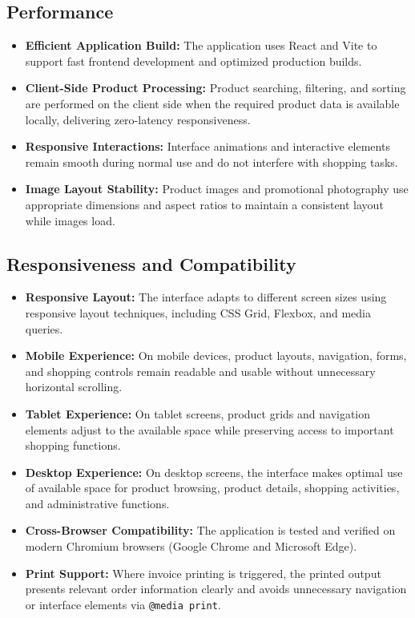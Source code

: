 \documentclass[12pt,a4paper,oneside]{report}
\begin{document}
\subsection{Performance}
\begin{itemize}[leftmargin=1.2cm]
    \item \textbf{Efficient Application Build:} The application uses React and Vite to support fast frontend development and optimized production builds.
    \item \textbf{Client-Side Product Processing:} Product searching, filtering, and sorting are performed on the client side when the required product data is available locally, delivering zero-latency responsiveness.
    \item \textbf{Responsive Interactions:} Interface animations and interactive elements remain smooth during normal use and do not interfere with shopping tasks.
    \item \textbf{Image Layout Stability:} Product images and promotional photography use appropriate dimensions and aspect ratios to maintain a consistent layout while images load.
\end{itemize}

\subsection{Responsiveness and Compatibility}
\begin{itemize}[leftmargin=1.2cm]
    \item \textbf{Responsive Layout:} The interface adapts to different screen sizes using responsive layout techniques, including CSS Grid, Flexbox, and media queries.
    \item \textbf{Mobile Experience:} On mobile devices, product layouts, navigation, forms, and shopping controls remain readable and usable without unnecessary horizontal scrolling.
    \item \textbf{Tablet Experience:} On tablet screens, product grids and navigation elements adjust to the available space while preserving access to important shopping functions.
    \item \textbf{Desktop Experience:} On desktop screens, the interface makes optimal use of available space for product browsing, product details, shopping activities, and administrative functions.
    \item \textbf{Cross-Browser Compatibility:} The application is tested and verified on modern Chromium browsers (Google Chrome and Microsoft Edge).
    \item \textbf{Print Support:} Where invoice printing is triggered, the printed output presents relevant order information clearly and avoids unnecessary navigation or interface elements via \texttt{@media print}.
\end{itemize}
\end{document}
